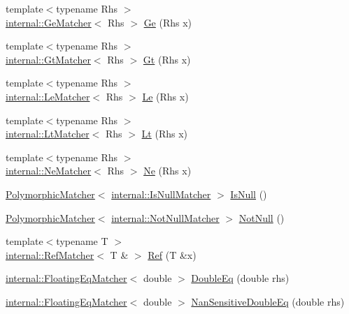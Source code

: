 \begin{DoxyCompactItemize}
{\footnotesize template$<$typename Rhs $>$ }\\\hyperlink{classtesting_1_1internal_1_1GeMatcher}{internal\+::\+Ge\+Matcher}$<$ Rhs $>$ \hyperlink{namespacetesting_a42bb19b42d7830b972973a103d5e00f2}{Ge} (Rhs x)
\item 
{\footnotesize template$<$typename Rhs $>$ }\\\hyperlink{classtesting_1_1internal_1_1GtMatcher}{internal\+::\+Gt\+Matcher}$<$ Rhs $>$ \hyperlink{namespacetesting_a493fc1bafd7b3945ba06ace80e74b0d5}{Gt} (Rhs x)
\item 
{\footnotesize template$<$typename Rhs $>$ }\\\hyperlink{classtesting_1_1internal_1_1LeMatcher}{internal\+::\+Le\+Matcher}$<$ Rhs $>$ \hyperlink{namespacetesting_a2e33596921b80a7fdaff3f62bf18a478}{Le} (Rhs x)
\item 
{\footnotesize template$<$typename Rhs $>$ }\\\hyperlink{classtesting_1_1internal_1_1LtMatcher}{internal\+::\+Lt\+Matcher}$<$ Rhs $>$ \hyperlink{namespacetesting_ad621459957a8bcdd3c256b7940ecbf99}{Lt} (Rhs x)
\item 
{\footnotesize template$<$typename Rhs $>$ }\\\hyperlink{classtesting_1_1internal_1_1NeMatcher}{internal\+::\+Ne\+Matcher}$<$ Rhs $>$ \hyperlink{namespacetesting_afe42d41d5171234cb9da5da27faeb7e8}{Ne} (Rhs x)
\item 
\hyperlink{classtesting_1_1PolymorphicMatcher}{Polymorphic\+Matcher}$<$ \hyperlink{classtesting_1_1internal_1_1IsNullMatcher}{internal\+::\+Is\+Null\+Matcher} $>$ \hyperlink{namespacetesting_a56ffb1a169c14ce585fc5bed32add2db}{Is\+Null} ()
\item 
\hyperlink{classtesting_1_1PolymorphicMatcher}{Polymorphic\+Matcher}$<$ \hyperlink{classtesting_1_1internal_1_1NotNullMatcher}{internal\+::\+Not\+Null\+Matcher} $>$ \hyperlink{namespacetesting_a39d1f92b53b8b2a0b6db6a22ac146416}{Not\+Null} ()
\item 
{\footnotesize template$<$typename T $>$ }\\\hyperlink{classtesting_1_1internal_1_1RefMatcher}{internal\+::\+Ref\+Matcher}$<$ T \& $>$ \hyperlink{namespacetesting_a0a4a364121ea3fa656a112f1c2e6b7a4}{Ref} (T \&x)
\item 
\hyperlink{classtesting_1_1internal_1_1FloatingEqMatcher}{internal\+::\+Floating\+Eq\+Matcher}$<$ double $>$ \hyperlink{namespacetesting_a1f49f9d97f03bfa4db26888f03486a9f}{Double\+Eq} (double rhs)
\item 
\hyperlink{classtesting_1_1internal_1_1FloatingEqMatcher}{internal\+::\+Floating\+Eq\+Matcher}$<$ double $>$ \hyperlink{namespacetesting_aa83ee35256fd90033f615ef640245525}{Nan\+Sensitive\+Double\+Eq} (double rhs)

\end{DoxyCompactItemize}

